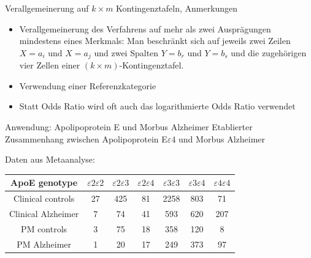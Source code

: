 \documentclass[
  10pt,
  ignorenonframetext,
]{beamer}
\providecommand{\tightlist}{%
  \setlength{\itemsep}{0pt}\setlength{\parskip}{0pt}}
\begin{document}
\begin{frame}{Verallgemeinerung auf \(k\times m\) Kontingenztafeln,
Anmerkungen}
\protect\hypertarget{verallgemeinerung-auf-ktimes-m-kontingenztafeln-anmerkungen}{}
\begin{itemize}
\tightlist
\item
  Verallgemeinerung des Verfahrens auf mehr als zwei Ausprägungen
  mindestens eines Merkmals: Man beschränkt sich auf jeweils zwei Zeilen
  \(X=a_i\) und \(X=a_j\) und zwei Spalten \(Y=b_r\) und \(Y=b_s\) und
  die zugehörigen vier Zellen einer \((k \times m)\)-Kontingenztafel.
\item
  Verwendung einer Referenzkategorie
\item
  Statt Odds Ratio wird oft auch das logarithmierte Odds Ratio verwendet
\end{itemize}
\end{frame}

\begin{frame}{Anwendung: Apolipoprotein E und Morbus Alzheimer}
\protect\hypertarget{anwendung-apolipoprotein-e-und-morbus-alzheimer}{}
Etablierter Zusammenhang zwischen Apolipoprotein E\(\varepsilon4\) und
Morbus Alzheimer

\vspace{0.5cm}

Daten aus Metaanalyse:

\vspace{0.3cm}

\begin{tabular}{c| c c c c c |c}
  ApoE genotype   & $\varepsilon2\varepsilon2$ & $\varepsilon2\varepsilon3$   & $\varepsilon2\varepsilon4$
  & $\varepsilon3\varepsilon3$  & $\varepsilon3\varepsilon4$ & $\varepsilon4\varepsilon4$ \\\hline
  Clinical controls & 27& 425&    81& 2258&   803&    71\\
  Clinical Alzheimer& 7   &74&    41& 593&    620&    207\\\hline \hline
  PM controls &3  &75&    18& 358 &120&   8\\
  PM Alzheimer    &1  &20&    17& 249&    373&    97\\
\end{tabular}
\end{frame}
\end{document}
